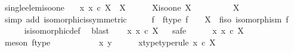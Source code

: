 \begin{isabellebody}
\ single{\isacharunderscore}{\kern0pt}elem{\isacharunderscore}{\kern0pt}iso{\isacharunderscore}{\kern0pt}one{\isacharcolon}{\kern0pt}\isanewline
\ \ {\isachardoublequoteopen}{\isacharparenleft}{\kern0pt}{\isasymexists}{\isacharbang}{\kern0pt}\ x{\isachardot}{\kern0pt}\ x\ {\isasymin}\isactrlsub c\ X{\isacharparenright}{\kern0pt}\ {\isasymlongleftrightarrow}\ X\ {\isasymcong}\ {\isasymone}{\isachardoublequoteclose}\isanewline
%
\isadelimproof
%
\endisadelimproof
%
\isatagproof
{}\isamarkupfalse%
\isanewline
\ \ \isamarkupfalse%
\ X{\isacharunderscore}{\kern0pt}iso{\isacharunderscore}{\kern0pt}one{\isacharcolon}{\kern0pt}\ {\isachardoublequoteopen}X\ {\isasymcong}\ {\isasymone}{\isachardoublequoteclose}\isanewline
\ \ \isamarkupfalse%
\ \isamarkupfalse%
\ {\isachardoublequoteopen}{\isasymone}\ {\isasymcong}\ X{\isachardoublequoteclose}\isanewline
\ \ \ \ \isamarkupfalse%
\ {\isacharparenleft}{\kern0pt}simp\ add{\isacharcolon}{\kern0pt}\ isomorphic{\isacharunderscore}{\kern0pt}is{\isacharunderscore}{\kern0pt}symmetric{\isacharparenright}{\kern0pt}\isanewline
\ \ \isamarkupfalse%
\ \isamarkupfalse%
\ f\ \ f{\isacharunderscore}{\kern0pt}type{\isacharcolon}{\kern0pt}\ {\isachardoublequoteopen}f\ {\isacharcolon}{\kern0pt}\ {\isasymone}\ {\isasymrightarrow}\ X{\isachardoublequoteclose}\ \ f{\isacharunderscore}{\kern0pt}iso{\isacharcolon}{\kern0pt}\ {\isachardoublequoteopen}isomorphism\ f{\isachardoublequoteclose}\isanewline
\ \ \ \ \isamarkupfalse%
\ is{\isacharunderscore}{\kern0pt}isomorphic{\isacharunderscore}{\kern0pt}def\ \isamarkupfalse%
\ blast\isanewline
\ \ \isamarkupfalse%
\ {\isachardoublequoteopen}{\isasymexists}{\isacharbang}{\kern0pt}x{\isachardot}{\kern0pt}\ x\ {\isasymin}\isactrlsub c\ X{\isachardoublequoteclose}\isanewline
\ \ \isamarkupfalse%
{\isacharparenleft}{\kern0pt}safe{\isacharparenright}{\kern0pt}\isanewline
\ \ \ \ \isamarkupfalse%
\ {\isachardoublequoteopen}{\isasymexists}x{\isachardot}{\kern0pt}\ x\ {\isasymin}\isactrlsub c\ X{\isachardoublequoteclose}\isanewline
\ \ \ \ \ \ \isamarkupfalse%
\ {\isacharparenleft}{\kern0pt}meson\ f{\isacharunderscore}{\kern0pt}type{\isacharparenright}{\kern0pt}\isanewline
\ \ \isamarkupfalse%
\ \ \isanewline
\ \ \ \ \isamarkupfalse%
\ x\ y\isanewline
\ \ \ \ \isamarkupfalse%
\ x{\isacharunderscore}{\kern0pt}type{\isacharbrackleft}{\kern0pt}type{\isacharunderscore}{\kern0pt}rule{\isacharbrackright}{\kern0pt}{\isacharcolon}{\kern0pt}\ {\isachardoublequoteopen}x\ {\isasymin}\isactrlsub c\ X{\isachardoublequoteclose}\isanewline

\end{isabellebody}
